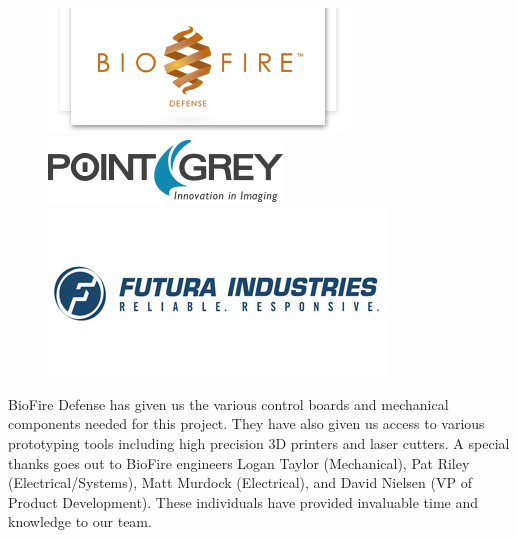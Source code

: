 \documentclass[11pt,english]{article}
\begin{document}
\begin{figure}[!htb]
  \includegraphics[width=\linewidth]{biofire_logo.png}
  \label{fig:biofire_logo}
\endminipage\hfill
{}
  \includegraphics[width=\linewidth]{point_grey.png}
  \label{fig:point_grey}
\endminipage\hfill
{}%
  \includegraphics[width=\linewidth]{futura_indust.jpg}
  \label{fig:futura_indst}
\endminipage
\label{fig:project_sponsors}
\end{figure}

BioFire Defense has given us the various control boards and mechanical components needed for this project. They have also given us access to various prototyping tools including high precision 3D printers and laser cutters. A special thanks goes out to BioFire engineers Logan Taylor (Mechanical), Pat Riley (Electrical/Systems), Matt Murdock (Electrical), and David Nielsen (VP of Product Development). These individuals have provided invaluable time and knowledge to our team.
\end{document}
